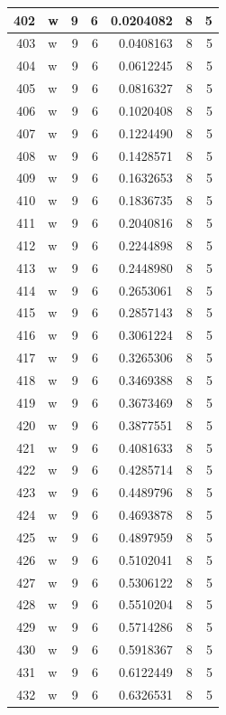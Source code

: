 \documentclass[
  letterpaper,
  DIV=11,
  numbers=noendperiod]{scrreprt}
\begin{document}
\begin{table}
\begin{tabular}[t]{r|l|r|r|r|r|r}
\hline
402 & w & 9 & 6 & 0.0204082 & 8 & 5\\
\hline
403 & w & 9 & 6 & 0.0408163 & 8 & 5\\
\hline
404 & w & 9 & 6 & 0.0612245 & 8 & 5\\
\hline
405 & w & 9 & 6 & 0.0816327 & 8 & 5\\
\hline
406 & w & 9 & 6 & 0.1020408 & 8 & 5\\
\hline
407 & w & 9 & 6 & 0.1224490 & 8 & 5\\
\hline
408 & w & 9 & 6 & 0.1428571 & 8 & 5\\
\hline
409 & w & 9 & 6 & 0.1632653 & 8 & 5\\
\hline
410 & w & 9 & 6 & 0.1836735 & 8 & 5\\
\hline
411 & w & 9 & 6 & 0.2040816 & 8 & 5\\
\hline
412 & w & 9 & 6 & 0.2244898 & 8 & 5\\
\hline
413 & w & 9 & 6 & 0.2448980 & 8 & 5\\
\hline
414 & w & 9 & 6 & 0.2653061 & 8 & 5\\
\hline
415 & w & 9 & 6 & 0.2857143 & 8 & 5\\
\hline
416 & w & 9 & 6 & 0.3061224 & 8 & 5\\
\hline
417 & w & 9 & 6 & 0.3265306 & 8 & 5\\
\hline
418 & w & 9 & 6 & 0.3469388 & 8 & 5\\
\hline
419 & w & 9 & 6 & 0.3673469 & 8 & 5\\
\hline
420 & w & 9 & 6 & 0.3877551 & 8 & 5\\
\hline
421 & w & 9 & 6 & 0.4081633 & 8 & 5\\
\hline
422 & w & 9 & 6 & 0.4285714 & 8 & 5\\
\hline
423 & w & 9 & 6 & 0.4489796 & 8 & 5\\
\hline
424 & w & 9 & 6 & 0.4693878 & 8 & 5\\
\hline
425 & w & 9 & 6 & 0.4897959 & 8 & 5\\
\hline
426 & w & 9 & 6 & 0.5102041 & 8 & 5\\
\hline
427 & w & 9 & 6 & 0.5306122 & 8 & 5\\
\hline
428 & w & 9 & 6 & 0.5510204 & 8 & 5\\
\hline
429 & w & 9 & 6 & 0.5714286 & 8 & 5\\
\hline
430 & w & 9 & 6 & 0.5918367 & 8 & 5\\
\hline
431 & w & 9 & 6 & 0.6122449 & 8 & 5\\
\hline
432 & w & 9 & 6 & 0.6326531 & 8 & 5\\

\end{tabular}
\end{table}
\end{document}
